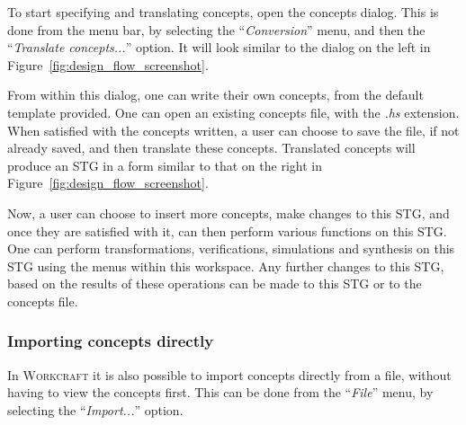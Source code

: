 \documentclass[british,conference,compsoc]{IEEEtran}
\newcommand{\noun}[1]{\textsc{#1}}
\begin{document}
To start specifying and translating concepts, open the concepts dialog.  This is
done from the menu bar, by selecting the ``\emph{Conversion}'' menu, and then
the ``\emph{Translate concepts...}'' option. It will look similar to the dialog 
on the left in Figure~\ref{fig:design_flow_screenshot}.

From within this dialog, one can write their own concepts, from the default 
template provided. One can open an 
existing concepts file, with the \emph{.hs} extension. When satisfied with the 
concepts written, a user can choose to save the file, if not already saved, and
then translate these concepts. Translated concepts will produce an STG in a 
form similar to that on the right in Figure~\ref{fig:design_flow_screenshot}.

Now, a user can choose to insert more 
concepts, make changes to this STG, and once they are satisfied with it, can 
then perform various functions on this STG. One can perform transformations, 
verifications, simulations and synthesis on this STG using the menus within this 
workspace. Any further changes to this STG, based on the results of these 
operations can be made to this STG or to the concepts file. 

\subsubsection{Importing concepts directly}

\vspace{-2mm}

In \noun{Workcraft} it is also possible to import concepts directly from a file,
without having to view the concepts first. This can be done from the 
``\emph{File}'' menu, by selecting the ``\emph{Import...}'' option. 
\end{document}
